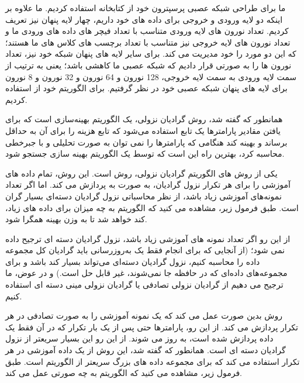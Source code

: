 \documentclass[12pt,onecolumn,a4paper]{article}
\begin{document}
ما برای طراحی شبکه عصبی پرسپترون خود از  کتابخانه  استفاده کردیم. ما علاوه بر اینکه دو لایه ورودی و خروجی برای داده های خود داریم، چهار لایه پنهان نیز تعریف کردیم.
تعداد نورون های لایه ورودی متناسب با تعداد فیچر های داده های ورودی ما و تعداد نورون های لایه خروجی نیز متناسب با تعداد برچسب های کلاس های ما هستند؛ که این دو مورد را خود   مدیریت می کند. برای سایر لایه های پنهان شبکه خود نیز، تعداد نورون ها را به صورتی قرار دادیم که شبکه عصبی ما کاهشی باشد؛ یعنی به ترتیب از سمت لایه ورودی به سمت لایه خروجی، 128 نورون و 64 نورون و 32 نورون و 8 نورون برای لایه های پنهان شبکه عصبی خود در نظر گرفتیم. برای الگوریتم خود از  استفاده کردیم.

همانطور که گفته شد، روش گرادیان نزولی، یک الگوریتم بهینه‌سازی است که برای یافتن مقادیر پارامترها یک تابع استفاده می‌شود که تابع هزینه را برای آن به حداقل برساند و بهینه کند هنگامی که پارامترها را نمی توان به صورت تحلیلی و با جبرخطی محاسبه کرد، بهترین راه این است که توسط یک الگوریتم بهینه سازی جستجو شود.

یکی از روش های الگوریتم گرادیان نزولی، روش  است. این روش، تمام داده های آموزشی را برای هر تکرار نزول گرادیان، به صورت  به  پردازش می کند. اما اگر تعداد نمونه‌های آموزشی زیاد باشد، از نظر محاسباتی نزول گرادیان دسته‌ای بسیار گران است. طبق فرمول زیر، مشاهده می کنید که الگوریتم  به چه میزان برای داده های زیاد، کند خواهد شد تا به وزن بهینه همگرا شود.


از این رو اگر تعداد نمونه های آموزشی زیاد باشد، نزول گرادیان دسته ای ترجیح داده نمی شود؛ (از آنجایی که برای انجام فقط یک به‌روزرسانی باید گرادیان کل مجموعه داده را محاسبه کنیم، نزول گرادیان دسته‌ای می‌تواند بسیار کند باشد و برای مجموعه‌های داده‌ای که در حافظه جا نمی‌شوند، غیر قابل حل است.) و در عوض، ما ترجیح می دهیم از گرادیان نزولی تصادفی یا گرادیان نزولی مینی دسته ای استفاده کنیم.

روش  بدین صورت عمل می کند که یک نمونه آموزشی را به صورت تصادفی در هر تکرار پردازش می کند. از این رو، پارامترها حتی پس از یک بار تکرار که در آن فقط یک داده پردازش شده است، به روز می شوند. از این رو این بسیار سریعتر از نزول گرادیان دسته ای است. همانطور که گفته شد، این روش از یک داده آموزشی در هر تکرار استفاده می کند که برای مجموعه داده های بزرگ سریعتر از الگوریتم  است. طبق فرمول زیر، مشاهده می کنید که الگوریتم  به چه صورتی عمل می کند.
\end{document}
